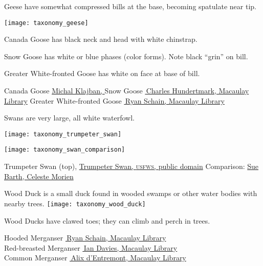 \documentclass[t]{beamer}
\newcommand{\backoneline}{\vspace{-\baselineskip}}
\begin{document}
\begin{frame}{Geese have somewhat compressed bills at the base, becoming spatulate near tip.}


\texttt{[image: taxonomy\_geese]}

Canada Goose has black neck and head with white chinstrap.

Snow Goose has white or blue phases (color forms). Note black “grin” on bill.

Greater White-fronted Goose has white on face at base of bill.

\vfilll

\tiny Canada Goose \href{https://commons.wikimedia.org/wiki/File:Canada_goose_(Branta_canadensis),_Lake_Victoria,_Christchurch,_New_Zealand_04.jpg}{Michal Klajban, } 
\hfill 
Snow Goose \href{https://macaulaylibrary.org/asset/47881261}{\textcopyright\,Charles Hundertmark, Macaulay Library}
\hfill
Greater White-fronted Goose \href{https://macaulaylibrary.org/asset/36909271}{\textcopyright\,Ryan Schain, Macaulay Library}


\end{frame}

\begin{frame}{Swans are very large, all white waterfowl.}

\vspace{-0.5\baselineskip}
\texttt{[image: taxonomy\_trumpeter\_swan]}

\texttt{[image: taxonomy\_swan\_comparison]}

\vfilll

\tiny Trumpeter Swan (top), \href{https://www.fws.gov/species/trumpeter-swan-cygnus-buccinator}{Trumpeter Swan, \textsc{usfws,} public domain} 
\hfill Comparison: \href{https://finwr.org/which-swan-is-which/}{Sue Barth, Celeste Morien}

\end{frame}

\begin{frame}{Wood Duck is a small duck found in wooded swamps or other water bodies with nearby trees.}
\texttt{[image: taxonomy\_wood\_duck]}

Wood Ducks have clawed toes; they can climb and perch in trees.
\end{frame}

{
\begin{frame}



\vfilll

\tiny \hfill
Hooded Merganser \href{https://macaulaylibrary.org/asset/36549821}{\textcopyright\,Ryan Schain, Macaulay Library}\\ \hfill
Red-breasted Merganser \href{https://macaulaylibrary.org/asset/23444211}{\textcopyright\,Ian Davies, Macaulay Library} \\ \hfill
Common Merganser \href{https://macaulaylibrary.org/asset/51564761}{\textcopyright\,Alix d'Entremont, Macaulay Library}
\end{frame}
}
\end{document}
